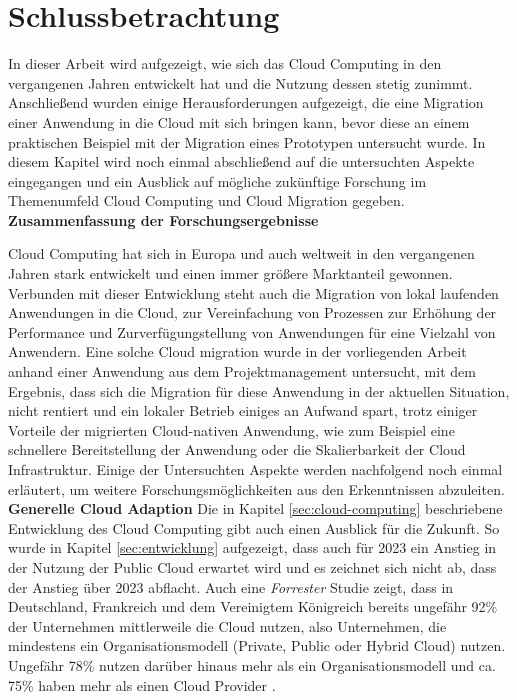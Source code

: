 \chapter{Schlussbetrachtung}
\label{chap:schlussbetrachtung}
In dieser Arbeit wird aufgezeigt, wie sich das Cloud Computing in den vergangenen Jahren entwickelt hat und die Nutzung dessen stetig zunimmt. Anschließend wurden einige Herausforderungen aufgezeigt, die eine Migration einer Anwendung in die Cloud mit sich bringen kann, bevor diese an einem praktischen Beispiel mit der Migration eines Prototypen untersucht wurde. In diesem Kapitel wird noch einmal abschließend auf die untersuchten Aspekte eingegangen und ein Ausblick auf mögliche zukünftige Forschung im Themenumfeld Cloud Computing und Cloud Migration gegeben. \\

\textbf{Zusammenfassung der Forschungsergebnisse}

Cloud Computing hat sich in Europa und auch weltweit in den vergangenen Jahren stark entwickelt und einen immer größere Marktanteil gewonnen. Verbunden mit dieser Entwicklung steht auch die Migration von lokal laufenden Anwendungen in die Cloud, zur Vereinfachung von Prozessen zur Erhöhung der Performance und Zurverfügungstellung von Anwendungen für eine Vielzahl von Anwendern. Eine solche Cloud migration wurde in der vorliegenden Arbeit anhand einer Anwendung aus dem Projektmanagement untersucht, mit dem Ergebnis, dass sich die Migration für diese Anwendung in der aktuellen Situation, nicht rentiert und ein lokaler Betrieb einiges an Aufwand spart, trotz einiger Vorteile der migrierten Cloud-nativen Anwendung, wie zum Beispiel eine schnellere Bereitstellung der Anwendung oder die Skalierbarkeit der Cloud Infrastruktur. Einige der Untersuchten Aspekte werden nachfolgend noch einmal erläutert, um weitere Forschungsmöglichkeiten aus den Erkenntnissen abzuleiten. \\

\textbf{Generelle Cloud Adaption}
Die in Kapitel \ref{sec:cloud-computing} beschriebene Entwicklung des Cloud Computing gibt auch einen Ausblick für die Zukunft. So wurde in Kapitel \ref{sec:entwicklung} aufgezeigt, dass auch für 2023 ein Anstieg in der Nutzung der Public Cloud erwartet wird und es zeichnet sich nicht ab, dass der Anstieg über 2023 abflacht. Auch eine \textit{Forrester} Studie zeigt, dass in Deutschland, Frankreich und dem Vereinigtem Königreich bereits ungefähr 92\% der Unternehmen mittlerweile die Cloud nutzen, also Unternehmen, die mindestens ein Organisationsmodell (Private, Public oder Hybrid Cloud) nutzen. Ungefähr 78\% nutzen darüber hinaus mehr als ein Organisationsmodell und ca. 75\% haben mehr als einen Cloud Provider \cite[Vgl.][S. 4]{Rajamani2022}. \pagebreak

